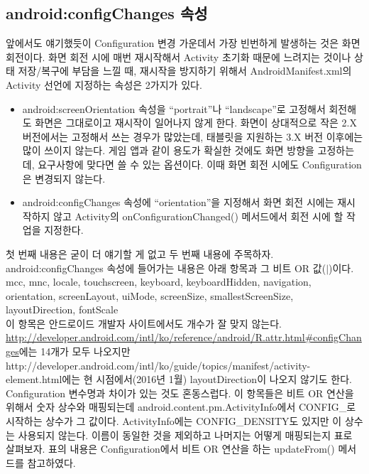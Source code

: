 \subsection{android:configChanges 속성}
앞에서도 얘기했듯이 Configuration 변경 가운데서 가장 빈번하게 발생하는 것은 화면 회전이다. 화면 회전 시에 매번 재시작해서 Activity 초기화 때문에 느려지는 것이나 상태 저장/복구에 부담을 느낄 때, 재시작을 방지하기 위해서 AndroidManifest.xml의 Activity 선언에 지정하는 속성은 2가지가 있다.
\begin{itemize}
\item android:screenOrientation 속성을 ``portrait''나 ``landscape''로 고정해서 회전해도 화면은 그대로이고 재시작이 일어나지 않게 한다. 화면이 상대적으로 작은 2.X 버전에서는 고정해서 쓰는 경우가 많았는데, 태블릿을 지원하는 3.X 버전 이후에는 많이 쓰이지 않는다. 게임 앱과 같이 용도가 확실한 것에도 화면 방향을 고정하는데, 요구사항에 맞다면 쓸 수 있는 옵션이다. 이때 화면 회전 시에도 Configuration은 변경되지 않는다.
\item android:configChanges 속성에 ``orientation''을 지정해서 화면 회전 시에는 재시작하지 않고 Activity의 onConfigurationChanged() 메서드에서 회전 시에 할 작업을 지정한다.
\end{itemize}

첫 번째 내용은 굳이 더 얘기할 게 없고 두 번째 내용에 주목하자.
android:configChanges 속성에 들어가는 내용은 아래 항목과 그 비트 OR 값($|$)이다.\\
mcc, mnc, locale,
touchscreen, keyboard, keyboardHidden, 
navigation, orientation, screenLayout, uiMode, screenSize,
smallestScreenSize, layoutDirection, fontScale\\

이 항목은 안드로이드 개발자 사이트에서도 개수가 잘 맞지 않는다. \url{http://developer.android.com/intl/ko/reference/android/R.attr.html\#configChanges}에는 14개가 모두 나오지만 http://developer.android.com/intl/ko/guide/topics/manifest/activity-element.html에는 현 시점에서(2016년 1월) layoutDirection이 나오지 않기도 한다.\\

Configuration 변수명과 차이가 있는 것도 혼동스럽다. 이 항목들은 비트 OR 연산을 위해서 숫자 상수와 매핑되는데 android.content.pm.ActivityInfo에서 CONFIG\_로 시작하는 상수가 그 값이다.
ActivityInfo에는 CONFIG\_DENSITY도 있지만 이 상수는 사용되지 않는다.
이름이 동일한 것을 제외하고 나머지는 어떻게 매핑되는지 표로 살펴보자. 표의 내용은 Configuration에서 비트 OR 연산을 하는 updateFrom() 메서드를 참고하였다.\\

